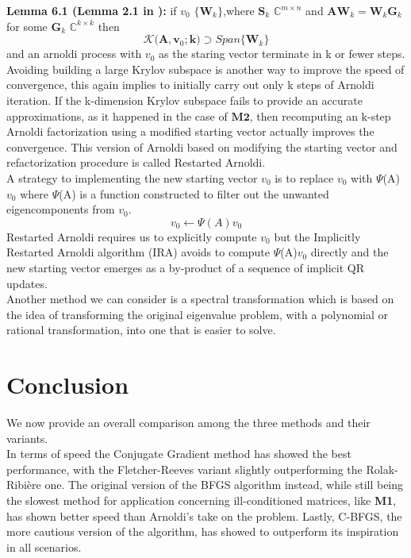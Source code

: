 \documentclass{article}
\numberwithin{equation}{section}
\begin{document}
\textbf{Lemma 6.1 (Lemma 2.1 in \cite{caho}):} if $v_0$ \in $\big\{\boldsymbol{W}_k \big\} $,where  $\boldsymbol{S}_k $  \in   $\mathbb{C}^{m \times n}$ and $\boldsymbol{A}\boldsymbol{W}_k = \boldsymbol{W}_k\boldsymbol{G}_k$ for some $\boldsymbol{G}_k$ \in   $\mathbb{C}^{k \times k}$  then 
\begin{equation}
  \mathcal{K}\big(\boldsymbol{A},\boldsymbol{v}_0;\boldsymbol{k}\big) \supset Span \big\{\boldsymbol{W}_k \big\} 
\end{equation}
and an arnoldi process with ${v}_0$ as the staring vector terminate in k or fewer steps. \\ 

Avoiding building a large Krylov subspace is another way to improve the speed of convergence, this again implies to initially carry out only k steps of Arnoldi iteration. If the k-dimension Krylov subspace fails to provide an accurate approximations, as it happened in the case of $\boldsymbol{M2}$, then recomputing an k-step Arnoldi factorization using a modified starting vector actually improves the convergence. This version of Arnoldi based on modifying the starting vector and refactorization procedure is called Restarted Arnoldi.\\

A strategy to implementing the new starting vector $v_0$ is to replace $v_0$ with $\Psi$(A)$v_0$ where $\Psi$(A) is a function constructed to filter out the unwanted eigencomponents from $v_0$. 
\begin{equation}
    v_0 \leftarrow \Psi(A)v_0 
\end{equation}
Restarted Arnoldi requires us to explicitly compute $v_0$ but the Implicitly Restarted Arnoldi algorithm  (IRA) avoids to compute $\Psi$(A)$v_0$ directly and the new starting vector emerges as a by-product of a sequence of implicit QR updates.  \\

Another method we can consider is a spectral transformation which is based on the idea of transforming the original eigenvalue problem, with a polynomial or rational transformation, into one that is easier to solve.
\section{Conclusion}
We now provide an overall comparison among the three methods and their variants.\\

In terms of speed the Conjugate Gradient method has showed the best performance, with the Fletcher-Reeves variant slightly outperforming the Rolak-Ribière one. The original version of the BFGS algorithm instead, while still being the slowest method for application concerning ill-conditioned matrices, like \textbf{M1}, has shown better speed than Arnoldi's take on the problem. Lastly, C-BFGS, the more cautious version of the algorithm, has showed to outperform its inspiration in all scenarios. 
\\
\end{document}
